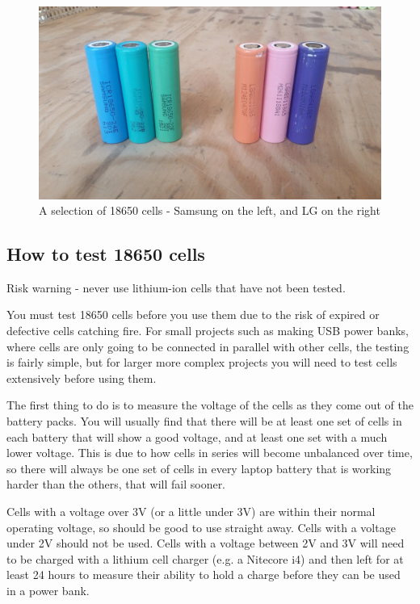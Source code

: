 \documentclass{article}
\theoremstyle{definition}
\theoremstyle{definition}
\theoremstyle{remark}
\begin{document}
    \begin{figure}[!ht]
      \centering
      \includegraphics[width=0.4\paperwidth]{Images/image_5_4_(samsung_lg_cells).png}
      \caption*{\centering A selection of 18650 cells - Samsung on the left, and LG on the right}
    \end{figure}


  \subsection{How to test 18650 cells} %
  \label{sub:how_to_test_18650_cells}

    Risk warning - never use lithium-ion cells that have not been tested.

    You must test 18650 cells before you use them due to the risk of expired or defective cells catching fire. For small projects such as making USB power banks, where cells are only going to be connected in parallel with other cells, the testing is fairly simple, but for larger more complex projects you will need to test cells extensively before using them.

    The first thing to do is to measure the voltage of the cells as they come out of the battery packs. You will usually find that there will be at least one set of cells in each battery that will show a good voltage, and at least one set with a much lower voltage. This is due to how cells in series will become unbalanced over time, so there will always be one set of cells in every laptop battery that is working harder than the others, that will fail sooner.

    Cells with a voltage over 3V (or a little under 3V) are within their normal operating voltage, so should be good to use straight away. Cells with a voltage under 2V should not be used. Cells with a voltage between 2V and 3V will need to be charged with a lithium cell charger (e.g. a Nitecore i4) and then left for at least 24 hours to measure their ability to hold a charge before they can be used in a power bank.
\end{document}
